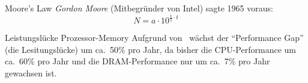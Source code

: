 \begin{defi}{Moore's Law}
    \label{defi:moores_law}
    \emph{Gordon Moore} (Mitbegründer von Intel) sagte 1965 voraus:
    \[N = a\cdot 10^{\frac{1}{5}\cdot t}\]
\end{defi}

\begin{bonus}{Leistungslücke Prozessor-Memory}
    Aufgrund von~ wächst der \enquote{Performance Gap} (die Lesitungslücke) um ca.\ 50\% pro Jahr,
    da bisher die CPU-Performance um ca.\ 60\% pro Jahr und die DRAM-Performance nur um ca.\ 7\% pro Jahr gewachsen ist.
\end{bonus}
